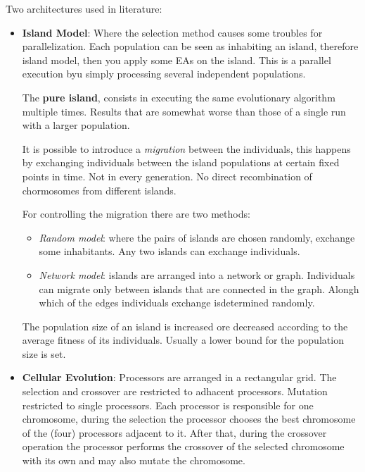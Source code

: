 \documentclass{article}
\begin{document}
Two architectures used in literature:
\begin{itemize}
    \item \textbf{Island Model}: Where the selection method causes some troubles for parallelization.
    Each population can be seen as inhabiting an island, therefore island model, then you
    apply some EAs on the island. This is a parallel execution byu simply processing several
    independent populations.
    
    The \textbf{pure island},
    consists in executing the same evolutionary algorithm multiple times. Results that are somewhat worse than
    those of a single run with a larger population.

    It is possible to introduce a \textit{migration} between the individuals, this happens by exchanging
    individuals between the island populations at certain fixed points in time. Not in every generation.
    No direct recombination of chormosomes from different islands.

    For controlling the migration there are two methods:
    \begin{itemize}
        \item \textit{Random model}: where the pairs of islands are chosen randomly, exchange
        some inhabitants. Any two islands can exchange individuals.
        \item \textit{Network model}: islands are arranged into a network or graph. Individuals
        can migrate only between islands that are connected in the graph. Alongh which of the
        edges individuals exchange isdetermined randomly.
    \end{itemize}

    The population size of an island is increased ore decreased according to the average fitness
    of its individuals. Usually a lower bound for the population size is set.

   \item \textbf{Cellular Evolution}: Processors are arranged in a rectangular grid. The
   selection and crossover are restricted to adhacent processors. Mutation restricted to single processors.
   Each processor is responsible for one chromosome, during the selection the processor chooses
   the best chromosome of the (four) processors adjacent to it. After that, during the
   crossover operation the processor performs the crossover of the selected chromosome with its own and
   may also mutate the chromosome.

\end{itemize}
\end{document}
